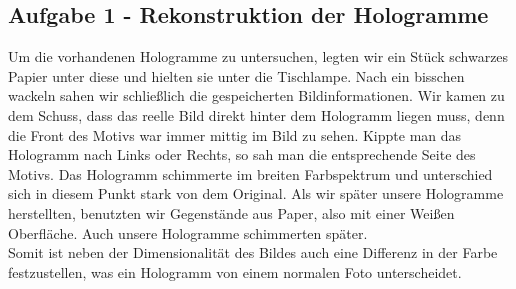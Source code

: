 \subsection*{Aufgabe 1 - Rekonstruktion der Hologramme}
Um die vorhandenen Hologramme zu untersuchen, legten wir ein Stück schwarzes Papier unter diese und hielten sie unter die Tischlampe. Nach ein bisschen wackeln sahen wir schließlich die gespeicherten Bildinformationen. Wir kamen zu dem Schuss, dass das reelle Bild direkt hinter dem Hologramm liegen muss, denn die Front des Motivs war immer mittig im Bild zu sehen. Kippte man das Hologramm nach Links oder Rechts, so sah man die entsprechende Seite des Motivs. Das Hologramm schimmerte im breiten Farbspektrum und unterschied sich in diesem Punkt stark von dem Original. Als wir später unsere Hologramme herstellten, benutzten wir Gegenstände aus Paper, also mit einer Weißen Oberfläche. Auch unsere Hologramme schimmerten später.\\
Somit ist neben der Dimensionalität des Bildes auch eine Differenz in der Farbe festzustellen, was ein Hologramm von einem normalen Foto unterscheidet.